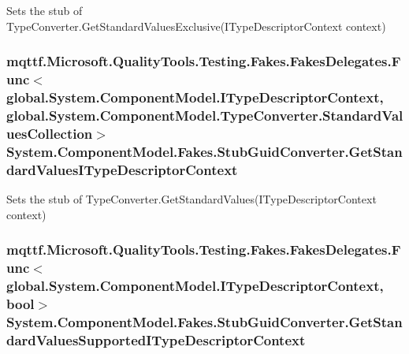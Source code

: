 Sets the stub of Type\-Converter.\-Get\-Standard\-Values\-Exclusive(\-I\-Type\-Descriptor\-Context context)

\hypertarget{class_system_1_1_component_model_1_1_fakes_1_1_stub_guid_converter_a89debb121ae8b70f5f65ce5076051101}{
\subsubsection[{Get\-Standard\-Values\-I\-Type\-Descriptor\-Context}]{\setlength{\rightskip}{0pt plus 5cm}mqttf.\-Microsoft.\-Quality\-Tools.\-Testing.\-Fakes.\-Fakes\-Delegates.\-Func$<$global.\-System.\-Component\-Model.\-I\-Type\-Descriptor\-Context, global.\-System.\-Component\-Model.\-Type\-Converter.\-Standard\-Values\-Collection$>$ System.\-Component\-Model.\-Fakes.\-Stub\-Guid\-Converter.\-Get\-Standard\-Values\-I\-Type\-Descriptor\-Context}}\label{class_system_1_1_component_model_1_1_fakes_1_1_stub_guid_converter_a89debb121ae8b70f5f65ce5076051101}


Sets the stub of Type\-Converter.\-Get\-Standard\-Values(\-I\-Type\-Descriptor\-Context context)

\hypertarget{class_system_1_1_component_model_1_1_fakes_1_1_stub_guid_converter_ab7be991df01e3153d0b9f8175cc13f56}{
\subsubsection[{Get\-Standard\-Values\-Supported\-I\-Type\-Descriptor\-Context}]{\setlength{\rightskip}{0pt plus 5cm}mqttf.\-Microsoft.\-Quality\-Tools.\-Testing.\-Fakes.\-Fakes\-Delegates.\-Func$<$global.\-System.\-Component\-Model.\-I\-Type\-Descriptor\-Context, bool$>$ System.\-Component\-Model.\-Fakes.\-Stub\-Guid\-Converter.\-Get\-Standard\-Values\-Supported\-I\-Type\-Descriptor\-Context}}\label{class_system_1_1_component_model_1_1_fakes_1_1_stub_guid_converter_ab7be991df01e3153d0b9f8175cc13f56}


